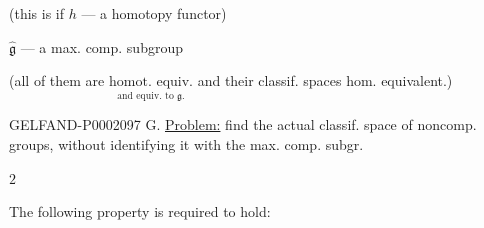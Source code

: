 (this is if $h$ --- a homotopy functor)



$\hat{\mathfrak g}$ --- a max. comp. subgroup



(all of them are $\underset{\text{and equiv. to }\mathfrak g.}{\text{homot. equiv.}}$ and their classif. spaces hom. equivalent.)



\begin{GelfandAdjacentEvidence}{GELFAND-P000209}{7}
G. \underline{Problem:} find the actual classif. space of noncomp. groups,
without identifying it with the max. comp. subgr.






\end{GelfandAdjacentEvidence}



\begin{flushright}$2$\end{flushright}



The following property is required to hold:



